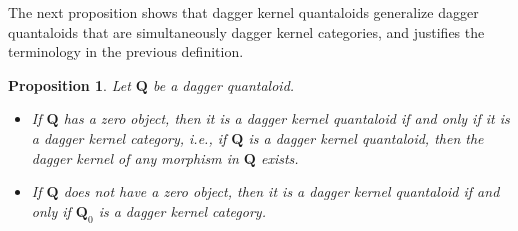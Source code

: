 \documentclass[12pt]{tac}
\newtheorem{proposition}[theorem]{Proposition}
\theoremstyle{definition}
\theoremstyle{remark}
\newcommand{\<}{\langle}
\renewcommand{\>}{\rangle}
\renewcommand{\:}{\colon}
\begin{document}
The next proposition shows that dagger kernel quantaloids generalize dagger quantaloids that are simultaneously dagger kernel categories, and justifies the terminology in the previous definition.

\begin{proposition}\label{prop:dagger kernel quantaloid}
Let $\mathbf Q$ be a dagger quantaloid. 
\begin{itemize}
    \item[(a)] If $\mathbf Q$ has a zero object, then it is a dagger kernel quantaloid if and only if it is a dagger kernel category, i.e., if $\mathbf Q$ is a dagger kernel quantaloid, then the dagger kernel of any morphism in $\mathbf Q$ exists.
\item[(b)] If $\mathbf Q$ does not have a zero object, then it is a dagger kernel quantaloid if and only if $\mathbf Q_0$ is a dagger kernel category.
\end{itemize}
\end{proposition}
\end{document}
